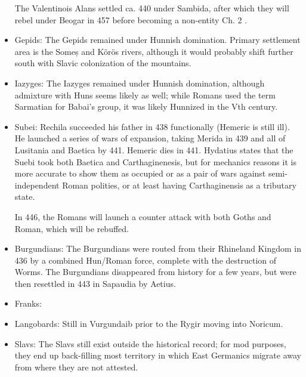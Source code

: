 \documentclass{article}
\newcommand{\specificCite}[1]{\tiny #1 \normalsize}
\begin{document}
\begin{itemize}
		The Valentinois Alans settled ca. 440 under Sambida, after which they will rebel under Beogar in 457 before becoming a non-entity \cite{BachrachAlans}\specificCite{Ch. 2}.
		
		\item Gepids:\newline
		The Gepids remained under Hunnish domination.
		Primary settlement area is the Someș and Körös rivers, although it would probably shift further south with Slavic colonization of the mountains.
		
		\item Iazyges:\newline
		The Iazyges remained under Hunnish domination, although admixture with Huns seems likely as well; while Romans used the term Sarmatian for Babai's group, it was likely Hunnized in the Vth century.
		
		\item Subei:\newline
		Rechila succeeded his father in 438 functionally (Hemeric is still ill).
		He launched a series of wars of expansion, taking Merida in 439 and all of Lusitania and Baetica by 441.
		Hemeric dies in 441.
		Hydatius states that the Suebi took both Baetica and Carthaginenesis, but for mechanics reasons it is more accurate to show them as occupied or as a pair of wars against semi-independent Roman polities, or at least having Carthaginensis as a tributary state.
		
		In 446, the Romans will launch a counter attack with both Goths and Roman, which will be rebuffed.
		
		\item Burgundians:\newline
		The Burgundians were routed from their Rhineland Kingdom in 436 by a combined Hun/Roman force, complete with the destruction of Worms. 
		The Burgundians disappeared from history for a few years, but were then resettled in 443 in Sapaudia by Aetius.
		
		\item Franks:\newline
		
		\item Langobards:\newline
		Still in Vurgundaib prior to the Rygir moving into Noricum.
		
		\item Slavs:\newline
		The Slavs still exist outside the historical record; for mod purposes, they end up back-filling most territory in which East Germanics migrate away from where they are not attested.
	\end{itemize}
	
\end{document}
